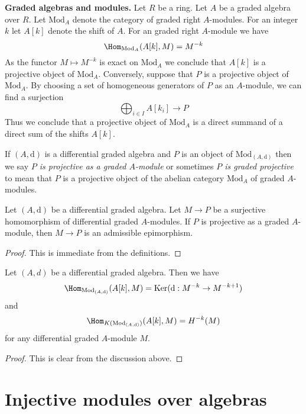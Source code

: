 \medskip\noindent
{\bf Graded algebras and modules.}
Let $R$ be a ring. Let $A$ be a graded algebra over $R$.
Let $\text{Mod}_A$ denote the category of graded right $A$-modules.
For an integer $k$ let $A[k]$ denote the shift of $A$.
For an graded right $A$-module we have
$$
\Hom_{\text{Mod}_A}(A[k], M) = M^{-k}
$$
As the functor $M \mapsto M^{-k}$ is exact on $\text{Mod}_A$ we
conclude that $A[k]$ is a projective object of $\text{Mod}_A$.
Conversely, suppose that $P$ is a projective object of $\text{Mod}_A$.
By choosing a set of homogeneous generators of $P$ as an $A$-module,
we can find a surjection
$$
\bigoplus\nolimits_{i \in I} A[k_i] \longrightarrow P
$$
Thus we conclude that a projective object of $\text{Mod}_A$ is
a direct summand of a direct sum of the shifts $A[k]$.

\medskip\noindent
If $(A, \text{d})$ is a differential graded algebra and $P$ is
an object of $\text{Mod}_{(A, \text{d})}$ then we say
{\it $P$ is projective as a graded $A$-module} or sometimes
{\it $P$ is graded projective} to mean
that $P$ is a projective object of the abelian category $\text{Mod}_A$
of graded $A$-modules.

\begin{lemma}
\label{lemma-target-graded-projective}
Let $(A, \text{d})$ be a differential graded algebra.
Let $M \to P$ be a surjective homomorphism of differential graded
$A$-modules. If $P$ is projective as a graded $A$-module, then
$M \to P$ is an admissible epimorphism.
\end{lemma}

\begin{proof}
This is immediate from the definitions.
\end{proof}

\begin{lemma}
\label{lemma-hom-from-shift-free}
Let $(A, d)$ be a differential graded algebra. Then we have
$$
\Hom_{\text{Mod}_{(A, \text{d})}}(A[k], M) =
\text{Ker}(\text{d} : M^{-k} \to M^{-k + 1})
$$
and
$$
\Hom_{K(\text{Mod}_{(A, \text{d})})}(A[k], M) = H^{-k}(M)
$$
for any differential graded $A$-module $M$.
\end{lemma}

\begin{proof}
This is clear from the discussion above.
\end{proof}







\section{Injective modules over algebras}
\label{section-modules-noncommutative}

